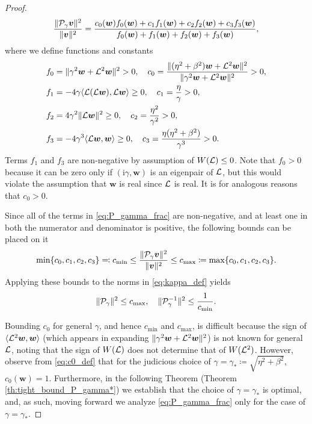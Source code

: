 \documentclass[a4paper,10pt]{article}
\begin{document}
\begin{proof}
\begin{align}
\label{eq:P_gamma_frac}
\frac{\Vert {\cal P}_{\gamma} \bm{v} \Vert^2}{\Vert \bm{v} \Vert^2}
=
\frac{
c_0(\bm{w}) f_0(\bm{w}) + c_1 f_1(\bm{w}) + c_2 f_2(\bm{w}) + c_3 f_3(\bm{w})
}
{
f_0(\bm{w}) + f_1(\bm{w}) + f_2(\bm{w}) + f_3(\bm{w})
},
\end{align}
where we define functions and constants
\begin{align}
\label{eq:c0_def}
f_0 &= \Vert \gamma^2 \bm{w} + {\cal L}^2 \bm{w} \Vert^2 > 0,
\quad
c_0 = \frac{\Vert (\eta^2 + \beta^2) \bm{w} + {\cal L}^2 \bm{w} \Vert^2}{\Vert \gamma^2 \bm{w} + {\cal L}^2 \bm{w} \Vert^2} > 0,
\\
\nonumber
f_1 &= -4 \gamma \langle {\cal L}({\cal L} \bm{w}), {\cal L} \bm{w} \rangle \geq 0,
\quad 
c_1 = \frac{\eta}{\gamma} > 0,\\
\nonumber
f_2 &= 4 \gamma^2 \Vert {\cal L} \bm{w} \Vert^2 \geq 0, 
\quad
c_2 = \frac{\eta^2}{\gamma^2} > 0, \\
\nonumber
f_3 &= -4 \gamma^3 \langle {\cal L} \bm{w}, \bm{w} \rangle \geq 0, 
\quad
c_3 = \frac{\eta (\eta^2 + \beta^2)}{\gamma^3} > 0.
\end{align}
Terms $f_1$ and $f_3$ are non-negative by assumption of $W({\cal L}) \leq 0$.
%
Note that $f_0 > 0$ because it can be zero only if $(\mathrm{i} \gamma, \bm{w})$ is an eigenpair of ${\cal L}$, but this would violate the assumption that $\bm{w}$ is real since ${\cal L}$ is real. It is for analogous reasons that $c_0 > 0$. 

Since all of the terms in \eqref{eq:P_gamma_frac} are non-negative, and at least one in both the numerator and denominator is positive, the following bounds can be placed on it
\begin{align*}
\min \{ c_0, c_1, c_2, c_3 \} \eqqcolon c_{\min}
\leq
\frac{\Vert {\cal P}_{\gamma} \bm{v} \Vert^2}{\Vert \bm{v} \Vert^2} 
\leq c_{\max} 
\coloneqq \max \{ c_0, c_1, c_2, c_3 \}.
\end{align*}
Applying these bounds to the norms in \eqref{eq:kappa_def} yields
\begin{align} \label{eq:P_gamma_bounds}
\Vert {\cal P}_{\gamma} \Vert^2 \leq c_{\max}, 
\quad
\Vert {\cal P}_{\gamma}^{-1} \Vert^2 \leq \frac{1}{c_{\min}}.
\end{align}

Bounding $c_0$ for general $\gamma$, and hence $c_{\min}$ and $c_{\max}$, is difficult because the sign of $\langle {\cal L}^2 \bm{w}, \bm{w} \rangle$ (which appears in expanding $\Vert \gamma^2 \bm{w} + {\cal L}^2 \bm{w} \Vert^2$) is not known for general ${\cal L}$, noting that the sign of $W({\cal L})$ does not determine that of $W({\cal L}^2)$. However, observe from \eqref{eq:c0_def} that for the judicious choice of $\gamma = \gamma_* \coloneqq \sqrt{\eta^2 + \beta^2}$, $c_0(\bm{w}) = 1$. Furthermore, in the following Theorem (Theorem \ref{th:tight_bound_P_gamma*}) we establish that the choice of $\gamma = \gamma_*$ is optimal, and, as such, moving forward we analyze \eqref{eq:P_gamma_frac} only for the case of $\gamma = \gamma_*$.


\end{proof}
\end{document}
